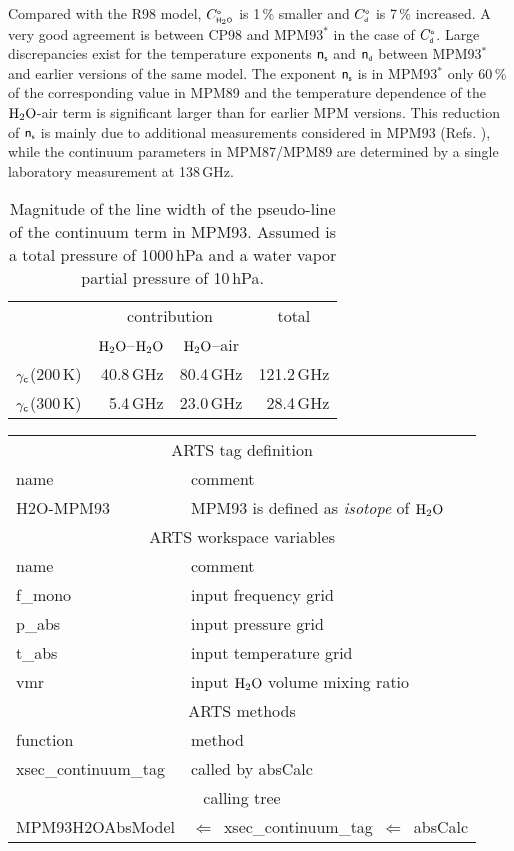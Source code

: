 {Compared with the R98 model, $C^{\mbox{\tiny \sf o}}_{\mbox{\tiny \sf H}_{2}\mbox{\tiny \sf O}}$ is 1\,\% smaller and
$C^{\mbox{\tiny \sf o}}_{\mbox{\tiny \sf d}}$ is 7\,\% increased. A very good agreement is between CP98 and
MPM93$^*$ in the case of $C^{\mbox{\tiny \sf o}}_{\mbox{\tiny \sf d}}$. Large discrepancies exist for the
temperature exponents ${\sf n}_{\mbox{\tiny \sf s}}$ and ${\sf n}_{\mbox{\tiny \sf d}}$ between MPM93$^*$ and earlier
versions of the same model. The exponent ${\sf n}_{\mbox{\tiny \sf s}}$ is in MPM93$^*$ only
60\,\% of the corresponding value in MPM89 and the temperature
dependence of the $\mbox{H}_2\mbox{O}$-air term is significant larger than for
earlier MPM versions. This reduction of ${\sf n}_{\mbox{\tiny \sf s}}$ is mainly due to 
additional measurements considered in MPM93 
(Refs. \cite{beckerautler:46,godonetal:92}), while the continuum 
parameters in MPM87/MPM89 are determined by a single laboratory 
measurement at 138\,GHz.
%
\begin{table}[!htb]
\begin{center}
\begin{tabular}{lrrr}
\hline
 & \multicolumn{2}{c}{contribution} & \multicolumn{1}{c}{total} \\
 & \multicolumn{1}{c}{$\mbox{H}_2\mbox{O}$--$\mbox{H}_2\mbox{O}$} & \multicolumn{1}{c}{$\mbox{H}_2\mbox{O}$--air} & \\
\hline
$\gamma_{\sf c}$(200\,K) & 40.8\,GHz & 80.4\,GHz & 121.2\,GHz\\
$\gamma_{\sf c}$(300\,K) &  5.4\,GHz & 23.0\,GHz &  28.4\,GHz\\
\hline
\end{tabular}
\caption{Magnitude of the line width of the pseudo-line of the
  continuum term in MPM93. Assumed is a total pressure of 1000\,hPa
  and a water vapor partial pressure of 10\,hPa.}
\label{tab:mpm_psl_broad}
\end{center}
\end{table} 
%
%
\begin{center}
\begin{tabular}{ll}
\hline
\multicolumn{2}{c}{ARTS tag definition}\\
name      & comment \\
H2O-MPM93 & MPM93 is defined as {\it isotope} of $\mbox{H}_2\mbox{O}$\\
\hline
\multicolumn{2}{c}{ARTS workspace variables}\\
name & comment \\
 f\_mono & input frequency grid \\
 p\_abs  & input pressure grid \\
 t\_abs  & input temperature grid\\
 vmr    & input $\mbox{H}_2\mbox{O}$ volume mixing ratio\\
\hline
\multicolumn{2}{c}{ARTS methods}\\
function           & method\\
xsec\_continuum\_tag & called by absCalc \\
\hline
\multicolumn{2}{c}{calling tree}\\
MPM93H2OAbsModel & $\Leftarrow$~xsec\_continuum\_tag~$\Leftarrow$~absCalc\\
\end{tabular}
\end{center}

}
